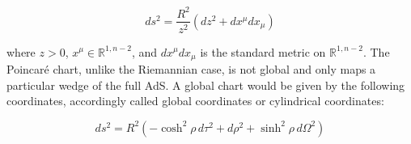 \documentclass[11pt,a4paper,twoside,openright]{book}
\begin{document}
\begin{equation}
ds^2 = \frac{R^2}{z^2} \left(dz^2 + dx^\mu dx_\mu \right)
\end{equation}

where $z>0$, $x^\mu \in \mathbb{R}^{1,n-2}$, and $dx^\mu dx_\mu$ is the standard metric on $\mathbb{R}^{1,n-2}$. The Poincaré chart, unlike the Riemannian case, is not global and only maps a particular wedge of the full AdS. A global chart would be given by the following coordinates, accordingly called global coordinates or cylindrical coordinates:

\begin{equation}
ds^2 = R^2 \left( -\cosh^2 \rho \, d\tau^2 + d\rho^2 + \sinh^2 \rho \, d\Omega^2 \right)
\end{equation}



\backmatter



\end{document}
